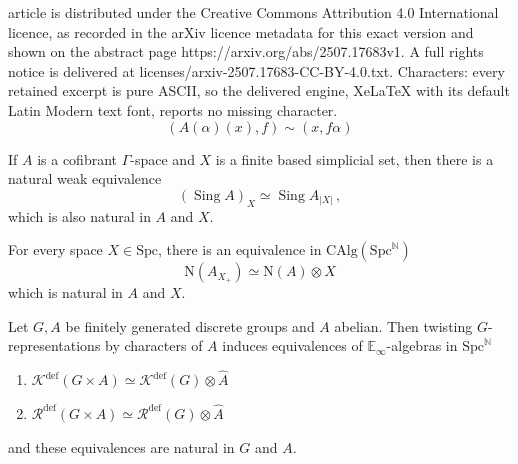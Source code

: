 \documentclass[10pt,a4paper]{amsart}
\DeclareMathOperator{\Sing}{Sing}
\newcommand{\CAlg}{\mathrm{CAlg}}
\newcommand{\Kdef}{\mathcal{K}^{\mathrm{def}}}
\newcommand{\N}{\mathbb{N}}
\newcommand{\Rdef}{\mathcal{R}^{\mathrm{def}}}
\newcommand{\Spc}{\mathrm{Spc}}
\begin{document}
article is distributed under the Creative Commons Attribution 4.0 International licence, as recorded in the arXiv licence metadata for this exact version and shown on the abstract page https://arxiv.org/abs/2507.17683v1. A full rights notice is delivered at licenses/arxiv-2507.17683-CC-BY-4.0.txt. Characters: every retained excerpt is pure ASCII, so the delivered engine, XeLaTeX with its default Latin Modern text font, reports no missing character.
\begin{equation} \label{eq:equivalencerelation}
(A(\alpha)(x),f)\sim (x,f \alpha)
\end{equation}

\begin{lemma} \label{lem:singular}
If $A$ is a cofibrant $\Gamma$-space and $X$ is a finite based simplicial set, then there is a natural weak equivalence
\[
(\Sing A)_X \simeq \Sing A_{|X|}\, ,
\]
which is also natural in $A$ and $X$.
\end{lemma}

\begin{corollary} \label{cor:tensor2}
For every space $X\in \Spc$, there is an equivalence in $\CAlg(\Spc^\N)$
\[
\mathrm{N}(A_{X_+})\simeq \mathrm{N}(A)\otimes X
\]
which is natural in $A$ and $X$.
\end{corollary}

\begin{proposition} \label{prop:key}
Let $G,A$ be finitely generated discrete groups and $A$ abelian. Then twisting $G$-representations by characters of $A$ induces equivalences of $\mathbb{E}_\infty$-algebras in $\Spc^\N$
\begin{enumerate}
\item[(1)] $\Kdef(G\times A)\simeq \Kdef(G) \otimes \widehat{A}$
\item[(2)] $\Rdef(G\times A)\simeq \Rdef(G) \otimes \widehat{A}$
\end{enumerate}
and these equivalences are natural in $G$ and $A$.
\end{proposition}
\end{document}
